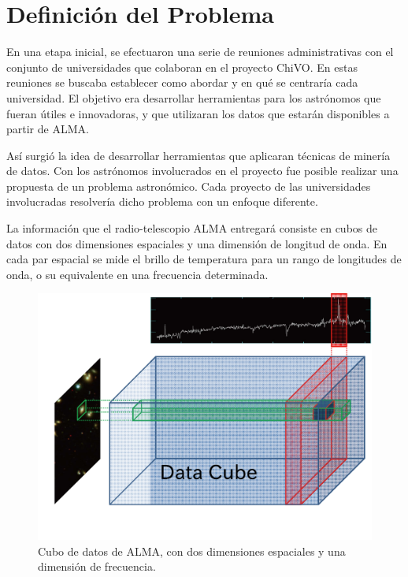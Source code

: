 \section{Definición del Problema}

En una etapa inicial, se efectuaron una serie de reuniones administrativas con el conjunto de universidades que colaboran en el proyecto ChiVO. En estas reuniones se buscaba establecer como abordar y en qué se centraría cada universidad. El objetivo era desarrollar herramientas para los astrónomos que fueran útiles e innovadoras, y que utilizaran los datos que estarán disponibles a partir de ALMA.

Así surgió la idea de desarrollar herramientas que aplicaran técnicas de minería de datos. Con los astrónomos involucrados en el proyecto fue posible realizar una propuesta de un problema astronómico. Cada proyecto de las universidades involucradas resolvería dicho problema con un enfoque diferente.

La información que el radio-telescopio ALMA entregará consiste en cubos de datos con dos dimensiones espaciales y una dimensión de longitud de onda. En cada par espacial se mide el brillo de temperatura para un rango de longitudes de onda, o su equivalente en una frecuencia determinada.

\begin{figure}[H]
	\begin{center}
		\includegraphics[width=140mm]{images/fig1}
		\caption{Cubo de datos de ALMA, con dos dimensiones espaciales y una dimensión de frecuencia.}
	\end{center}
\end{figure}

